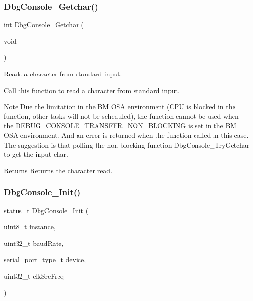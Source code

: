 \subsubsection{\texorpdfstring{DbgConsole\_Getchar()}{DbgConsole\_Getchar()}}
{\footnotesize\ttfamily int Dbg\+Console\+\_\+\+Getchar (\begin{DoxyParamCaption}\item[{void}]{ }\end{DoxyParamCaption})}



Reads a character from standard input. 

Call this function to read a character from standard input.

\begin{DoxyNote}{Note}
Due the limitation in the BM O\+SA environment (C\+PU is blocked in the function, other tasks will not be scheduled), the function cannot be used when the D\+E\+B\+U\+G\+\_\+\+C\+O\+N\+S\+O\+L\+E\+\_\+\+T\+R\+A\+N\+S\+F\+E\+R\+\_\+\+N\+O\+N\+\_\+\+B\+L\+O\+C\+K\+I\+NG is set in the BM O\+SA environment. And an error is returned when the function called in this case. The suggestion is that polling the non-\/blocking function Dbg\+Console\+\_\+\+Try\+Getchar to get the input char.
\end{DoxyNote}
\begin{DoxyReturn}{Returns}
Returns the character read. 
\end{DoxyReturn}
\mbox{\label{group__debugconsole_ga12e50ee0450679fd8ca950a89338d366}} 
\subsubsection{\texorpdfstring{DbgConsole\_Init()}{DbgConsole\_Init()}}
{\footnotesize\ttfamily \mbox{\hyperlink{group__ksdk__common_gaaabdaf7ee58ca7269bd4bf24efcde092}{status\+\_\+t}} Dbg\+Console\+\_\+\+Init (\begin{DoxyParamCaption}\item[{uint8\+\_\+t}]{instance,  }\item[{uint32\+\_\+t}]{baud\+Rate,  }\item[{\mbox{\hyperlink{group__serialmanager_gaa7dc5f93aacda72d14bb0fa66b0401f3}{serial\+\_\+port\+\_\+type\+\_\+t}}}]{device,  }\item[{uint32\+\_\+t}]{clk\+Src\+Freq }\end{DoxyParamCaption})}



